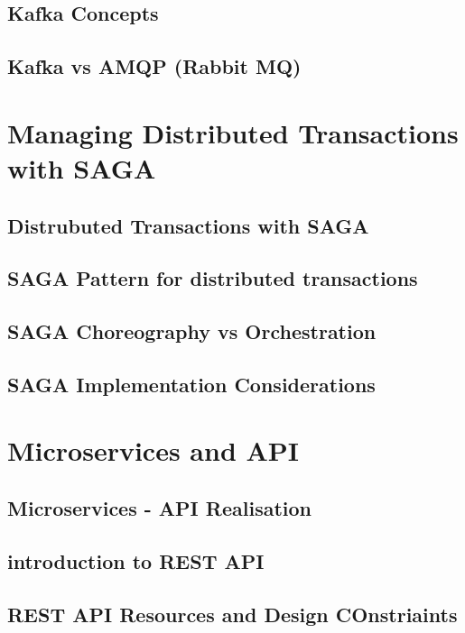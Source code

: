 \documentclass[a4paper, 11pt]{book}
\begin{document}
    \section{Kafka Concepts}


    \section{Kafka vs AMQP (Rabbit MQ)}


    \chapter{Managing Distributed Transactions with SAGA}


    \section{Distrubuted Transactions with SAGA}


    \section{SAGA Pattern for distributed transactions}


    \section{SAGA Choreography vs Orchestration}


    \section{SAGA Implementation Considerations}


    \chapter{Microservices and API}


    \section{Microservices - API Realisation}


    \section{introduction to REST API}


    \section{REST API Resources and Design COnstriaints}
\end{document}
